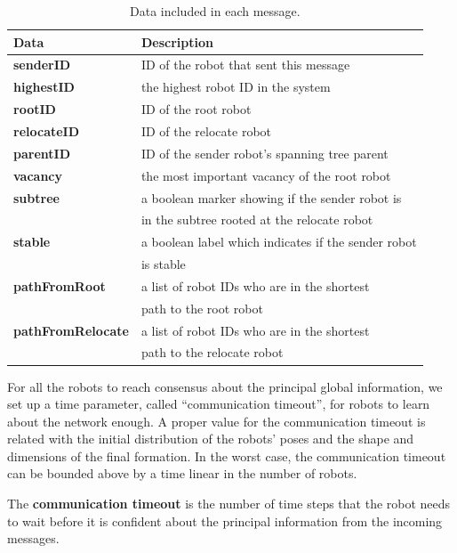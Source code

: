 \begin{table}
\caption{Data included in each message.}
   \begin{tabular}{ll}
    \toprule
    \textbf{Data}  & \textbf{Description}  \\
    \midrule
    \textbf{senderID} &  ID of the robot that sent this message\\
    \midrule
    \textbf{highestID} & the highest robot ID in the system\\
    \midrule
    \textbf{rootID} &  ID of the root robot\\
    \midrule
    \textbf{relocateID} &  ID of the relocate robot\\
    \midrule
    \textbf{parentID} &  ID of the sender robot's spanning tree parent \\
    \midrule
    \textbf{vacancy} & the most important vacancy of the root robot\\
    \midrule
    \textbf{subtree} & a boolean marker showing if the sender robot is \\
        & in the subtree rooted at the relocate robot \\
    \midrule
    \textbf{stable} & a boolean label which indicates if the sender robot \\
        & is stable\\
    \midrule
    \textbf{pathFromRoot} & a list of robot IDs who are in the shortest\\
        & path to the root robot\\
    \midrule
    \textbf{pathFromRelocate} & a list of robot IDs who are in the shortest \\
        & path to the relocate robot\\
    \bottomrule
  \end{tabular}
  \label{tab:msg}
\end{table}

For all the robots to reach consensus about the principal global
information, 
we set up a time parameter, called ``communication timeout'', for robots to learn about the network enough. 
%
A proper value for the communication timeout is related with the
initial distribution of the robots' poses and the shape and dimensions of the
final formation. 
%
In the worst case, the communication timeout can be bounded
above by a time linear in the number of robots.


\begin{defn}
  \label{def:timeout}
  The \textbf{communication timeout} is the number of time steps that the robot
  needs to wait before it is confident about the principal information from the
  incoming messages.
\end{defn}


